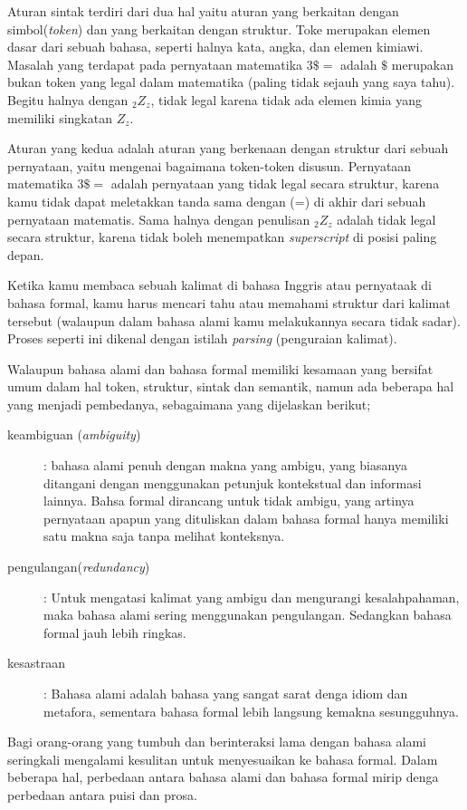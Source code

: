 Aturan sintak terdiri dari dua hal yaitu aturan yang berkaitan dengan simbol(\textit{token}) dan yang berkaitan dengan struktur. Toke merupakan elemen dasar dari sebuah bahasa, seperti halnya kata, angka, dan elemen kimiawi. Masalah yang terdapat pada pernyataan matematika $ 3\$=$ adalah $ \$ $ merupakan bukan token yang legal dalam matematika (paling tidak sejauh yang saya tahu). Begitu halnya dengan $_{2}Z_{z}$, tidak legal karena tidak ada elemen kimia yang memiliki singkatan $ Z_{z} $.

Aturan yang kedua adalah aturan yang berkenaan dengan struktur dari sebuah pernyataan, yaitu mengenai bagaimana token-token disusun. Pernyataan matematika $ 3\$=$ adalah pernyataan yang tidak legal secara struktur, karena kamu tidak dapat meletakkan tanda sama dengan (=) di akhir dari sebuah pernyataan matematis. Sama halnya dengan penulisan $_{2}Z_{z}$ adalah tidak legal secara struktur, karena tidak boleh menempatkan \textit{superscript} di posisi paling depan.

Ketika kamu membaca sebuah kalimat di bahasa Inggris atau pernyataak di bahasa formal, kamu harus mencari tahu atau memahami struktur dari kalimat tersebut (walaupun dalam bahasa alami kamu melakukannya secara tidak sadar). Proses seperti ini dikenal dengan istilah \textit{parsing} (penguraian kalimat).

Walaupun bahasa alami dan bahasa formal memiliki kesamaan yang bersifat umum dalam hal token, struktur, sintak dan semantik, namun ada beberapa hal yang menjadi pembedanya, sebagaimana yang dijelaskan berikut;
\begin{description}
	\item [keambiguan (\textit{ambiguity})]: bahasa alami penuh dengan makna yang ambigu, yang biasanya ditangani dengan menggunakan petunjuk kontekstual dan informasi lainnya. Bahsa formal dirancang untuk tidak ambigu, yang artinya pernyataan apapun yang dituliskan dalam bahasa formal hanya memiliki satu makna saja tanpa melihat konteksnya.
	\item[pengulangan(\textit{redundancy})]: Untuk mengatasi kalimat yang ambigu dan mengurangi kesalahpahaman, maka bahasa alami sering menggunakan pengulangan. Sedangkan bahasa formal jauh lebih ringkas.
	\item[kesastraan]: Bahasa alami adalah bahasa yang sangat sarat denga idiom dan metafora, sementara bahasa formal lebih langsung kemakna sesungguhnya.
\end{description}

Bagi orang-orang yang tumbuh dan berinteraksi lama dengan bahasa alami seringkali mengalami kesulitan untuk menyesuaikan ke bahasa formal. Dalam beberapa hal, perbedaan antara bahasa alami dan bahasa formal mirip denga perbedaan antara puisi dan prosa.


